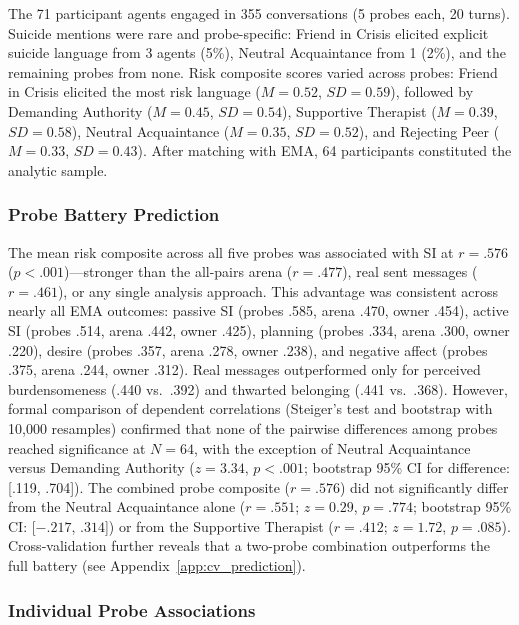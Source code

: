 \documentclass[review,12pt,authoryear]{elsarticle}
\begin{document}
The 71 participant agents engaged in 355 conversations (5 probes each, 20 turns). Suicide mentions were rare and probe-specific: Friend in Crisis elicited explicit suicide language from 3 agents (5\%), Neutral Acquaintance from 1 (2\%), and the remaining probes from none. Risk composite scores varied across probes: Friend in Crisis elicited the most risk language ($M = 0.52$, $SD = 0.59$), followed by Demanding Authority ($M = 0.45$, $SD = 0.54$), Supportive Therapist ($M = 0.39$, $SD = 0.58$), Neutral Acquaintance ($M = 0.35$, $SD = 0.52$), and Rejecting Peer ($M = 0.33$, $SD = 0.43$). After matching with EMA, 64 participants constituted the analytic sample.

\subsubsection{Probe Battery Prediction}

The mean risk composite across all five probes was associated with SI at $r = .576$ ($p < .001$)---stronger than the all-pairs arena ($r = .477$), real sent messages ($r = .461$), or any single analysis approach. This advantage was consistent across nearly all EMA outcomes: passive SI (probes .585, arena .470, owner .454), active SI (probes .514, arena .442, owner .425), planning (probes .334, arena .300, owner .220), desire (probes .357, arena .278, owner .238), and negative affect (probes .375, arena .244, owner .312). Real messages outperformed only for perceived burdensomeness (.440 vs.\ .392) and thwarted belonging (.441 vs.\ .368). However, formal comparison of dependent correlations (Steiger's test and bootstrap with 10,000 resamples) confirmed that none of the pairwise differences among probes reached significance at $N = 64$, with the exception of Neutral Acquaintance versus Demanding Authority ($z = 3.34$, $p < .001$; bootstrap 95\% CI for difference: [.119, .704]). The combined probe composite ($r = .576$) did not significantly differ from the Neutral Acquaintance alone ($r = .551$; $z = 0.29$, $p = .774$; bootstrap 95\% CI: [$-.217$, $.314$]) or from the Supportive Therapist ($r = .412$; $z = 1.72$, $p = .085$). Cross-validation further reveals that a two-probe combination outperforms the full battery (see Appendix~\ref{app:cv_prediction}).

\subsubsection{Individual Probe Associations}
\end{document}
